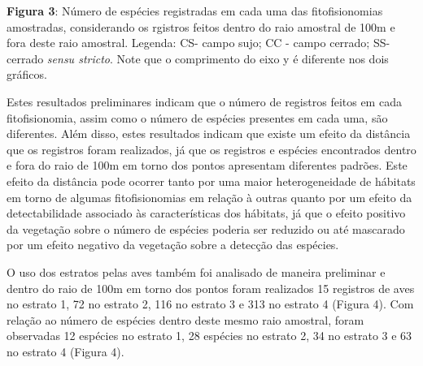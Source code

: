 \textbf{Figura 3}: Número de espécies registradas em cada uma das fitofisionomias amostradas, considerando os rgistros feitos dentro do raio amostral de 100m e fora deste raio amostral. Legenda: CS- campo sujo; CC -  campo cerrado; SS- cerrado \textit{sensu stricto}. Note que o comprimento do eixo y é diferente nos dois gráficos.

Estes resultados preliminares indicam que o número de registros feitos em cada fitofisionomia, assim como o número de espécies presentes em cada uma, são diferentes. Além disso, estes resultados indicam que existe um efeito da distância que os registros foram realizados, já que os registros e espécies encontrados dentro e fora do raio de 100m em torno dos pontos apresentam diferentes padrões. Este efeito da distância pode ocorrer tanto por uma maior heterogeneidade de hábitats em torno de algumas fitofisionomias em relação à outras quanto por um efeito da detectabilidade associado às características dos hábitats, já que o efeito positivo da vegetação sobre o número de espécies poderia ser reduzido ou até mascarado por um efeito negativo da vegetação sobre a detecção das espécies.

O uso dos estratos pelas aves também foi analisado de maneira preliminar e dentro do raio de 100m em torno dos pontos foram realizados 15 registros de aves no estrato 1, 72 no estrato 2, 116 no estrato 3 e 313 no estrato 4 (Figura 4). Com relação ao número de espécies dentro deste mesmo raio amostral, foram observadas 12 espécies no estrato 1, 28 espécies no estrato 2, 34 no estrato 3 e 63 no estrato 4 (Figura 4).